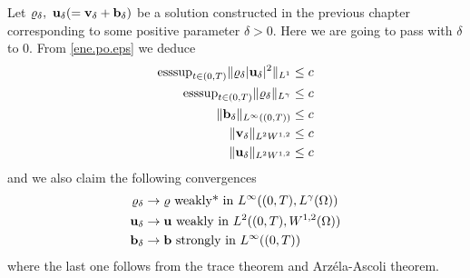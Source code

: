 \documentclass{article}
\newcommand{\bb}{{\bf b}}
\newcommand{\vb}{\bb}
\newcommand{\bu}{{\bf u}}
\newcommand{\vu}{\bu}
\newcommand{\bv}{{\bf v}}
\newcommand{\vv}{\bv}
\numberwithin{equation}{section}
\begin{document}
Let $\varrho_\delta,\ \vu_\delta( = \vv_\delta + \vb_\delta)$ be a solution constructed in the previous chapter corresponding to some positive parameter $\delta>0$. Here we are going to pass with $\delta$ to $0$. From \eqref{ene.po.eps} we deduce
\begin{equation}
\begin{split}\label{delta.odhady}
\mbox{esssup}_{t\in (0,T)} \|\varrho_\delta |\vu_\delta|^2\|_{L^1} & \leq c\\
\mbox{esssup}_{t\in (0,T)} \|\varrho_\delta\|_{L^\gamma} & \leq c\\
\|\vb_\delta\|_{L^\infty((0,T))} & \leq c\\
\|\vv_\delta\|_{L^2W^{1,2}} & \leq c\\
\|\vu_\delta\|_{L^2W^{1,2}} & \leq c
\end{split}
\end{equation}
and we also claim the following convergences
\begin{equation*}
\begin{split}
\varrho_\delta &\to \varrho\ \mbox{weakly* in }L^\infty((0,T),L^\gamma(\Omega))\\
\vu_\delta & \to \vu \ \mbox{weakly in }L^2((0,T),W^{1,2}(\Omega))\\
\vb_\delta & \to \vb \ \mbox{strongly in } L^\infty((0,T))
\end{split}
\end{equation*}
where the last one follows from the trace theorem and Arz\'ela-Ascoli theorem.
\end{document}

